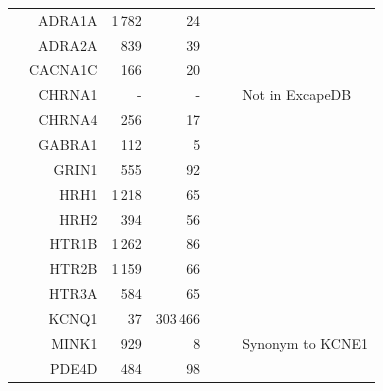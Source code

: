 \documentclass[10pt,article]{memoir}
\begin{document}
\begin{table}[p]
\begin{tabular}{crrrrcl}
&    ADRA1A  &       1\,782  &       24          &            &       &       \\
&    ADRA2A  &       839     &       39          &            &       &       \\
&    CACNA1C &       166     &       20          &            &       &       \\
&    CHRNA1  &       -       &       -           &            &       & Not in ExcapeDB \\
&    CHRNA4  &       256     &       17          &            &       &       \\
&    GABRA1  &       112     &       5           &            &       &       \\
&    GRIN1   &       555     &       92          &            &       &       \\
&    HRH1    &       1\,218  &       65          &            &       &       \\
&    HRH2    &       394     &       56          &            &       &       \\
&    HTR1B   &       1\,262  &       86          &            &       &       \\
&    HTR2B   &       1\,159  &       66          &            &       &       \\
&    HTR3A   &       584     &       65          &            &       &       \\
&    KCNQ1   &       37      &       303\,466    &            &       &       \\
&    MINK1   &       929     &       8           &            &       & Synonym to KCNE1 \\
&    PDE4D   &       484     &       98          &            &       &       \\

\bottomrule
\end{tabular}
\end{table}
\end{document}
